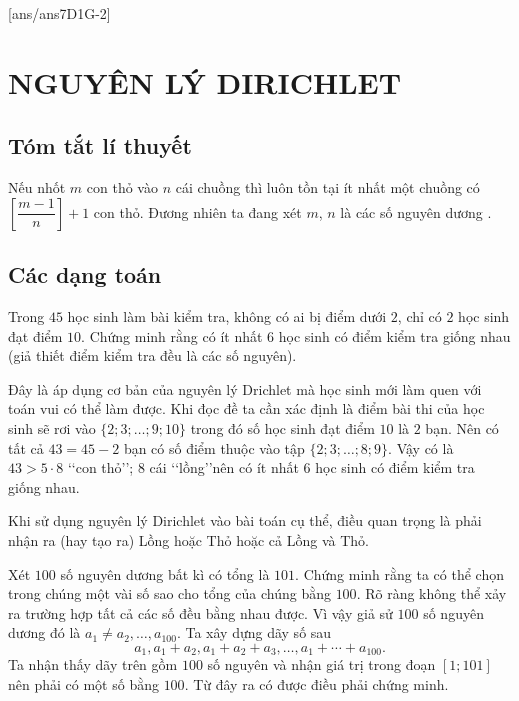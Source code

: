 [ans/ans7D1G-2]
\section{NGUYÊN LÝ DIRICHLET}
\subsection{Tóm tắt lí thuyết}
Nếu nhốt $m$ con thỏ vào $n$ cái chuồng thì luôn tồn tại ít nhất một chuồng có $\left[ \dfrac{m-1}{n} \right]+1$  con thỏ. Đương nhiên ta đang xét $m$, $n$ là các số nguyên dương .
\subsection{Các dạng toán}
\begin{dang}
\end{dang}

\begin{vd}
Trong $45$ học sinh làm bài kiểm tra, không có ai bị điểm dưới $2$, chỉ có $2$ học sinh đạt điểm $10$. Chứng minh rằng có ít nhất $6$ học sinh có điểm kiểm tra giống nhau (giả thiết điểm kiểm tra đều là các số nguyên).
\loigiai
{
Đây là áp dụng cơ bản của nguyên lý Drichlet mà học sinh mới làm quen với toán vui có thể làm được. Khi đọc đề ta cần xác định là điểm bài thi của học sinh sẽ rơi vào $\{2;3;\dotsc;9 ;10\}$ trong đó số học sinh đạt điểm $10$ là $2$ bạn. Nên có tất cả $43=45-2$ bạn  có số điểm thuộc vào tập $\{2;3; \dotsc ; 8; 9\}$. Vậy có là $43>5 \cdot 8$ \lq\lq con thỏ\rq\rq ; $8$  cái \lq\lq lồng\rq\rq nên có ít nhất $6$ học sinh có điểm kiểm tra giống nhau.
\begin{note}
Khi sử dụng nguyên lý Dirichlet vào bài toán cụ thể, điều quan trọng là phải nhận ra (hay tạo ra) Lồng hoặc Thỏ hoặc cả Lồng và Thỏ.
\end{note}
}
\end{vd}
\begin{vd}
Xét $100$ số nguyên dương bất kì có tổng là $101$. Chứng minh rằng ta có thể chọn trong chúng một vài số sao cho tổng của chúng bằng $100$.
\loigiai
{
Rõ ràng không thể xảy ra trường hợp tất cả các số đều bằng nhau được. Vì vậy giả sử $100$ số nguyên dương đó là $a_1 \ne a_2, \dotsc, a_{100}$.
Ta xây dựng dãy số sau 
$$ a_1, a_1+a_2, a_1+a_2+a_3, \dotsc, a_1+\dotsb +a_{100}. $$ 
Ta nhận thấy dãy trên gồm $100$ số nguyên và nhận giá trị trong đoạn $[1;101]$ nên phải có một số bằng $100$. Từ đây ra có được điều phải chứng minh.
}
\end{vd}

